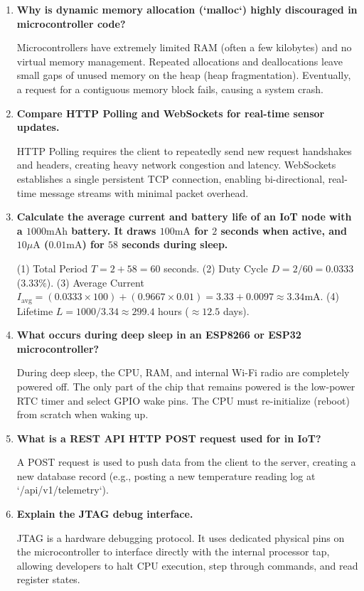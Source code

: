 \documentclass[12pt,a4paper]{article}
\newcommand{\Q}[1]{\textbf{#1}\par\noindent\ignorespaces}
\begin{document}
\begin{tcolorbox}[exambox, title={\textbf{Frequently Asked / Viva Questions}}]
\begin{enumerate}[leftmargin=*, topsep=0pt, label=\textbf{Q\arabic*.}, itemsep=6pt]
  \item \Q{Why is dynamic memory allocation (`malloc`) highly discouraged in microcontroller code?}
        Microcontrollers have extremely limited RAM (often a few kilobytes) and no virtual memory management. Repeated allocations and deallocations leave small gaps of unused memory on the heap (heap fragmentation). Eventually, a request for a contiguous memory block fails, causing a system crash.
        
  \item \Q{Compare HTTP Polling and WebSockets for real-time sensor updates.}
        HTTP Polling requires the client to repeatedly send new request handshakes and headers, creating heavy network congestion and latency. WebSockets establishes a single persistent TCP connection, enabling bi-directional, real-time message streams with minimal packet overhead.
        
  \item \Q{Calculate the average current and battery life of an IoT node with a $1000\text{mAh}$ battery. It draws $100\text{mA}$ for $2$ seconds when active, and $10\mu\text{A}$ ($0.01\text{mA}$) for $58$ seconds during sleep.}
        (1) Total Period $T = 2 + 58 = 60$ seconds. (2) Duty Cycle $D = 2 / 60 = 0.0333$ ($3.33\%$). (3) Average Current $I_{\text{avg}} = (0.0333 \times 100) + (0.9667 \times 0.01) = 3.33 + 0.0097 \approx 3.34\text{mA}$. (4) Lifetime $L = 1000 / 3.34 \approx 299.4$ hours ($\approx 12.5$ days).
        
  \item \Q{What occurs during deep sleep in an ESP8266 or ESP32 microcontroller?}
        During deep sleep, the CPU, RAM, and internal Wi-Fi radio are completely powered off. The only part of the chip that remains powered is the low-power RTC timer and select GPIO wake pins. The CPU must re-initialize (reboot) from scratch when waking up.
        
  \item \Q{What is a REST API HTTP POST request used for in IoT?}
        A POST request is used to push data from the client to the server, creating a new database record (e.g., posting a new temperature reading log at `/api/v1/telemetry`).
        
  \item \Q{Explain the JTAG debug interface.}
        JTAG is a hardware debugging protocol. It uses dedicated physical pins on the microcontroller to interface directly with the internal processor tap, allowing developers to halt CPU execution, step through commands, and read register states.
        

\end{enumerate}
\end{tcolorbox}
\end{document}

